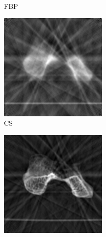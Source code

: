 \documentclass[journal]{IEEEtran}
\begin{document}
\begin{figure}[!h]
\begin{subfigure}[b]{0.23\linewidth}
        \caption{FBP}
     \end{subfigure}
    \begin{subfigure}[b]{0.23\linewidth}
        \includegraphics[width=\textwidth]{../images/humerus/global_local/reconNoPrior.png}
        \caption{CS}
    \end{subfigure}
    \begin{subfigure}[b]{0.23\linewidth}
        \includegraphics[width=\textwidth]{../images/humerus/global_local/global.png}

\end{subfigure}
\end{figure}
\end{document}
